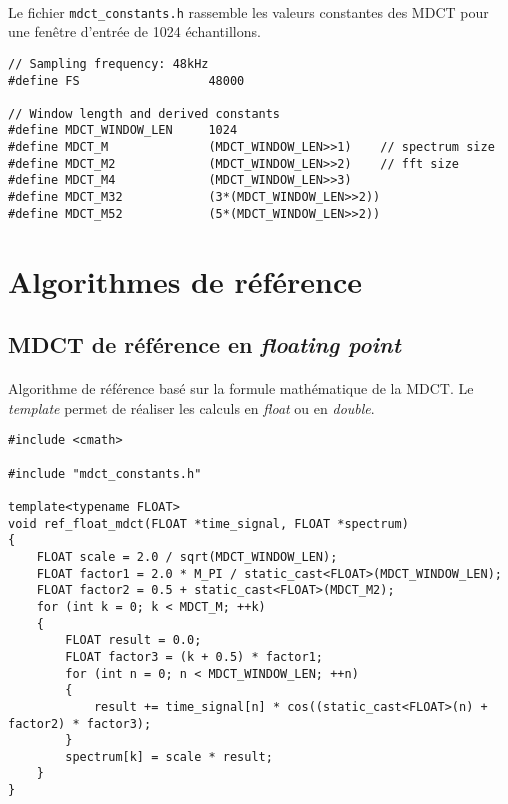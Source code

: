 \documentclass{article}
\begin{document}
\paragraph{}
Le fichier \texttt{mdct\_constants.h} rassemble les valeurs constantes des MDCT pour une fenêtre d'entrée de 1024 échantillons.
\lstset{language=C++}
\begin{lstlisting}
// Sampling frequency: 48kHz
#define FS                  48000

// Window length and derived constants
#define MDCT_WINDOW_LEN     1024
#define MDCT_M              (MDCT_WINDOW_LEN>>1)    // spectrum size
#define MDCT_M2             (MDCT_WINDOW_LEN>>2)    // fft size
#define MDCT_M4             (MDCT_WINDOW_LEN>>3)
#define MDCT_M32            (3*(MDCT_WINDOW_LEN>>2))
#define MDCT_M52            (5*(MDCT_WINDOW_LEN>>2))
\end{lstlisting}



\newpage
\section{Algorithmes de référence}\label{app:mdct_ref}
\subsection{MDCT de référence en \emph{floating point}}\label{app:mdct_ref_float}
\paragraph{}
Algorithme de référence basé sur la formule mathématique de la MDCT. Le \emph{template} permet de réaliser les calculs en \emph{float} ou en \emph{double}.
\lstset{language=C++}
\begin{lstlisting}
#include <cmath>

#include "mdct_constants.h"

template<typename FLOAT>
void ref_float_mdct(FLOAT *time_signal, FLOAT *spectrum)
{
    FLOAT scale = 2.0 / sqrt(MDCT_WINDOW_LEN);
    FLOAT factor1 = 2.0 * M_PI / static_cast<FLOAT>(MDCT_WINDOW_LEN);
    FLOAT factor2 = 0.5 + static_cast<FLOAT>(MDCT_M2);
    for (int k = 0; k < MDCT_M; ++k)
    {
        FLOAT result = 0.0;
        FLOAT factor3 = (k + 0.5) * factor1;
        for (int n = 0; n < MDCT_WINDOW_LEN; ++n)
        {
            result += time_signal[n] * cos((static_cast<FLOAT>(n) + factor2) * factor3);
        }
        spectrum[k] = scale * result;
    }
}
\end{lstlisting}
\end{document}
